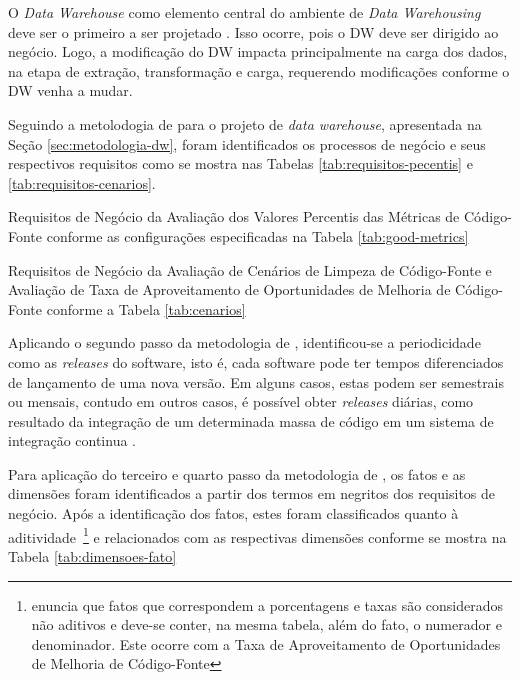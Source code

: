 O \textit{Data Warehouse} como elemento central do ambiente de \textit{Data Warehousing} deve ser o primeiro a ser projetado \cite{Kimball2002}. Isso ocorre, pois o DW deve ser dirigido ao negócio. Logo, a modificação do DW impacta principalmente na carga dos dados, na etapa de extração, transformação e carga, requerendo modificações conforme o DW venha a mudar.

Seguindo a metolodogia de  para o projeto de \textit{data warehouse}, apresentada na Seção \ref{sec:metodologia-dw}, foram identificados os processos de negócio e seus respectivos requisitos como se mostra nas Tabelas \ref{tab:requisitos-pecentis} e \ref{tab:requisitos-cenarios}. 


\begin{table}[H]
\centering

\caption{Requisitos de Negócio da Avaliação dos Valores Percentis das Métricas de Código-Fonte conforme as configurações especificadas na Tabela \ref{tab:good-metrics}}
\label{tab:requisitos-pecentis}
\end{table}
\FloatBarrier


\begin{table}[H]
\centering

\caption{Requisitos de Negócio da Avaliação de Cenários de Limpeza de Código-Fonte e Avaliação de Taxa de Aproveitamento de Oportunidades de Melhoria de Código-Fonte conforme a Tabela \ref{tab:cenarios}}
\label{tab:requisitos-cenarios}
\end{table}
\FloatBarrier


Aplicando o segundo passo da metodologia de , identificou-se a periodicidade como as \textit{releases} do software, isto é, cada software pode ter tempos diferenciados de lançamento de uma nova versão. Em alguns casos, estas podem ser semestrais ou mensais, contudo em outros casos, é possível obter \textit{releases} diárias, como resultado da integração de um determinada massa de código em um sistema de integração continua \cite{beckarticle1999}. 

Para aplicação do terceiro e quarto passo da metodologia de , os fatos e as dimensões foram identificados a partir dos termos em negritos dos requisitos de negócio. Após a identificação dos fatos, estes foram classificados quanto à aditividade~\footnote{ enuncia que fatos que correspondem a porcentagens e taxas são considerados não aditivos e deve-se conter, na mesma tabela, além do fato, o numerador e denominador. Este ocorre com a Taxa de Aproveitamento de Oportunidades de Melhoria de Código-Fonte} e relacionados com as respectivas dimensões conforme se mostra na Tabela \ref{tab:dimensoes-fato}


